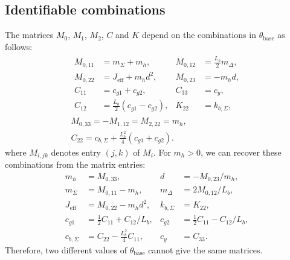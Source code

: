 \subsection{Identifiable combinations}\label{app:combos}
The matrices $M_0$, $M_1$, $M_2$, $C$ and $K$ depend on the combinations
in $\theta_{\mathrm{base}}$ as follows:
\begin{equation*}
\begin{gathered}
\begin{aligned}
 M_{0,11}&=m_\Sigma+m_h, & M_{0,12}&=\tfrac{L_b}{2}m_\Delta,\\
 M_{0,22}&=J_{\mathrm{eff}}+m_hd^2, & M_{0,23}&=-m_hd,\\
 C_{11}&=c_{g1}+c_{g2}, & C_{33}&=c_y,\\
 C_{12}&=\tfrac{L_b}{2}(c_{g1}-c_{g2}), & K_{22}&=k_{b,\Sigma},
\end{aligned}\\
 M_{0,33}=-M_{1,12}=M_{2,22}=m_h,\\
 C_{22}=c_{b,\Sigma}+\tfrac{L_b^2}{4}(c_{g1}+c_{g2}).
\end{gathered}
\end{equation*}
where $M_{i,jk}$ denotes entry $(j,k)$ of $M_i$.
For $m_h>0$, we can recover these combinations from the matrix entries:
\begin{equation*}
\begin{aligned}
 m_h&=M_{0,33}, & d&=-M_{0,23}/m_h,\\
 m_\Sigma&=M_{0,11}-m_h, & m_\Delta&=2M_{0,12}/L_b,\\
 J_{\mathrm{eff}}&=M_{0,22}-m_hd^2, & k_{b,\Sigma}&=K_{22},\\
 c_{g1}&=\tfrac12C_{11}+C_{12}/L_b, & c_{g2}&=\tfrac12C_{11}-C_{12}/L_b,\\
 c_{b,\Sigma}&=C_{22}-\tfrac{L_b^2}{4}C_{11}, & c_y&=C_{33}.
\end{aligned}
\end{equation*}
Therefore, two different values of $\theta_{\mathrm{base}}$ cannot give the same matrices.


